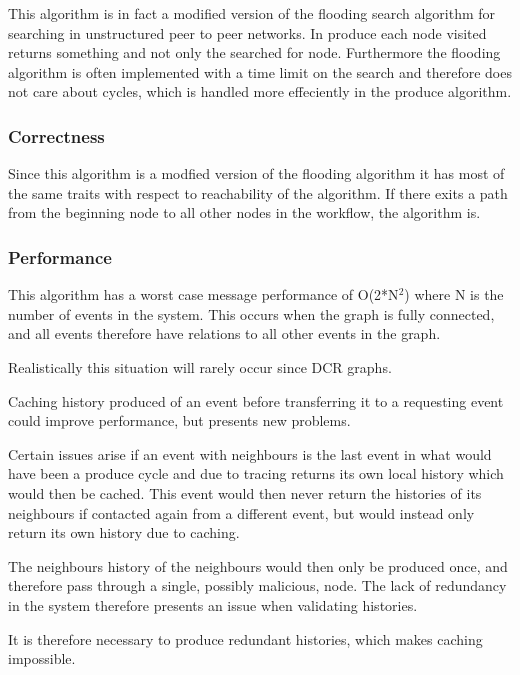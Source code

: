 	\newpar This algorithm is in fact a modified version of the flooding search algorithm for searching in unstructured peer to peer networks. In produce each node visited returns something and not only the searched for node. Furthermore the flooding algorithm is often implemented with a time limit on the search and therefore does not care about cycles, which is handled more effeciently in the produce algorithm.
	
	
	\subsubsection{Correctness}
	Since this algorithm is a modfied version of the flooding algorithm it has most of the same traits with respect to reachability of the algorithm. If there exits a path from the beginning node to all other nodes in the workflow, the algorithm is. 
	
	\subsubsection{Performance}
	This algorithm has a worst case message performance of O(2*N$^2$) where N is the number of events in the system. This occurs when the graph is fully connected, and all events therefore have relations to all other events in the graph. 
	
	Realistically this situation will rarely occur since DCR graphs. 
	
	\newpar Caching history produced of an event before transferring it to a requesting event could improve performance, but presents new problems. 
	
	Certain issues arise if an event with neighbours is the last event in what would have been a produce cycle and due to tracing returns its own local history which would then be cached. This event would then never return the histories of its neighbours if contacted again from a different event, but would instead only return its own history due to caching. 
	
	The neighbours history of the neighbours would then only be produced once, and therefore pass through a single, possibly malicious, node. The lack of redundancy in the system therefore presents an issue when validating histories.
	
	It is therefore necessary to produce redundant histories, which makes caching impossible.
	

